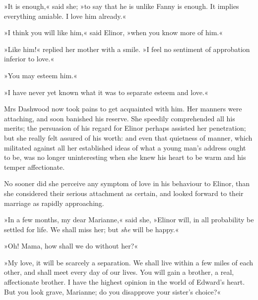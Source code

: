 »It is enough,« said she; »to say that he is unlike Fanny is enough. It implies everything amiable. I love him already.«

»I think you will like him,« said Elinor, »when you know more of him.«

»Like him!« replied her mother with a smile. »I feel no sentiment of approbation inferior to love.«

»You may esteem him.«

»I have never yet known what it was to separate esteem and love.«

Mrs Dashwood now took pains to get acquainted with him. Her manners were attaching, and soon banished his reserve. She speedily comprehended all his merits; the persuasion of his regard for Elinor perhaps assisted her penetration; but she really felt assured of his worth: and even that quietness of manner, which militated against all her established ideas of what a young man’s address ought to be, was no longer uninteresting when she knew his heart to be warm and his temper affectionate.

No sooner did she perceive any symptom of love in his behaviour to Elinor, than she considered their serious attachment as certain, and looked forward to their marriage as rapidly approaching.

»In a few months, my dear Marianne,« said she, »Elinor will, in all probability be settled for life. We shall miss her; but \textit{she} will be happy.«

»Oh! Mama, how shall we do without her?«

»My love, it will be scarcely a separation. We shall live within a few miles of each other, and shall meet every day of our lives. You will gain a brother, a real, affectionate brother. I have the highest opinion in the world of Edward’s heart. But you look grave, Marianne; do you disapprove your sister’s choice?«

